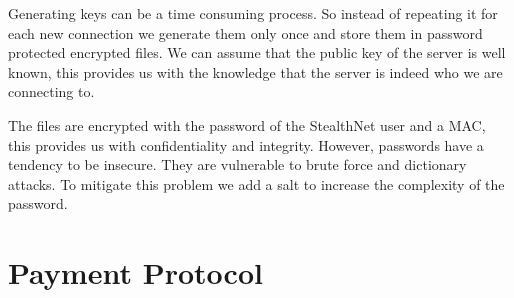 Generating keys can be a time consuming process. So instead of repeating it for each new connection we generate them only once and store them in password protected encrypted files. We can assume that the public key of the server is well known, this provides us with the knowledge that the server is indeed who we are connecting to.

The files are encrypted with the password of the StealthNet user and a MAC, this provides us with confidentiality and integrity. However, passwords have a tendency to be insecure. They are vulnerable to brute force and dictionary attacks. To mitigate this problem we add a salt to increase the complexity of the password.

\section{Payment Protocol}




